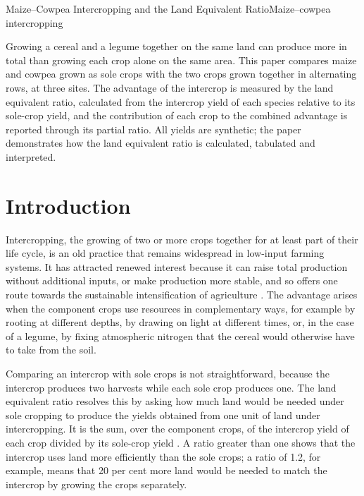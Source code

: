 \documentclass[../main.tex]{subfiles}
\begin{document}
\begin{paper}{Maize--Cowpea Intercropping and the Land Equivalent Ratio}{Maize--cowpea intercropping}
\label{paper:intercropping}

\begin{paperabstract}
Growing a cereal and a legume together on the same land can produce more in
total than growing each crop alone on the same area. This paper compares
maize and cowpea grown as sole crops with the two crops grown together in
alternating rows, at three sites. The advantage of the intercrop is measured
by the land equivalent ratio, calculated from the intercrop yield of each
species relative to its sole-crop yield, and the contribution of each crop to
the combined advantage is reported through its partial ratio. All yields are
synthetic; the paper demonstrates how the land equivalent ratio is calculated,
tabulated and interpreted.
\end{paperabstract}

\section{Introduction}

Intercropping, the growing of two or more crops together for at least part
of their life cycle, is an old practice that remains widespread in low-input
farming systems. It has attracted renewed interest because it can raise total
production without additional inputs, or make production more stable, and so
offers one route towards the sustainable intensification of agriculture
\parencite{brooker2015}. The advantage arises when the component crops use
resources in complementary ways, for example by rooting at different depths,
by drawing on light at different times, or, in the case of a legume, by fixing
atmospheric nitrogen that the cereal would otherwise have to take from the
soil.

Comparing an intercrop with sole crops is not straightforward, because the
intercrop produces two harvests while each sole crop produces one. The land
equivalent ratio resolves this by asking how much land would be needed under
sole cropping to produce the yields obtained from one unit of land under
intercropping. It is the sum, over the component crops, of the intercrop yield
of each crop divided by its sole-crop yield \parencite{mead1980}. A ratio
greater than one shows that the intercrop uses land more efficiently than the
sole crops; a ratio of 1.2, for example, means that 20 per cent more land
would be needed to match the intercrop by growing the crops separately.


\end{paper}
\end{document}
